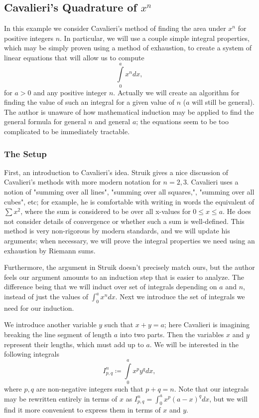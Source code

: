 \subsection{Cavalieri's Quadrature of \(x^n\)}

In this example we consider Cavalieri's method of finding the area under \(x^n\) for positive integers \(n\). In
particular, we will use a couple simple integral properties, which may be simply proven using a 
method of exhaustion, to create a system of linear equations that will allow us to compute 
\begin{equation}
\int\limits_0^a x^n dx,
\end{equation}
for \(a > 0\) and any positive integer \(n\). Actually we will create an algorithm for finding the value of such an
integral for a given value of \(n\) (\(a\) will still be general). The author is unaware of how 
mathematical induction may be applied to find the general formula for general \(n\) and general \(a\); the
equations seem to be too complicated to be immediately tractable.

\subsubsection*{The Setup}

First, an introduction to Cavalieri's idea. Struik \cite{struik} gives a nice discussion of Cavalieri's
methods with more modern notation for \(n = 2, 3\).
Cavalieri uses a notion of "summing over all lines", "summing over all squares,", "summing over all cubes", etc;
for example, he is comfortable with writing in words the equivalent of \(\sum x^2\), where the sum is considered to
be over all x-values for \(0 \leq x \leq a\). He does not consider details of convergence or whether such a sum
is well-defined. This method is very non-rigorous by modern standards, and we will
update his arguments; when necessary, we will prove the integral properties we need using an exhaustion by Riemann
sums. 

Furthermore, the argument in Struik \cite{struik} doesn't precisely match ours, but the author feels our argument
amounts to an induction step that is easier to analyze. The difference being that we will induct over set of
integrals depending on \(a\) and \(n\), instead of just the values of \(\int_0^a x^n dx\). Next we introduce
the set of integrals we need for our induction.

We introduce another variable \(y\) such that \(x + y = a\); here Cavalieri is imagining
breaking the line segment of length \(a\) into two parts. Then the variables \(x\) and \(y\) represent their
lengths, which must add up to \(a\). We will be interested in the following integrals
\begin{equation}
I^n_{p, q} \coloneqq \int\limits_0^a x^p y^q dx,
\end{equation}
where \(p, q\) are non-negative integers such that \(p + q = n\). Note that our integrals may
be rewritten entirely in terms of \(x\) as \(I^n_{p, q} = \int_0^a x^p (a - x)^q dx\), but we will find
it more convenient to express them in terms of \(x\) and \(y\). 

